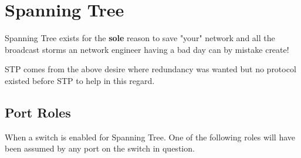 
\section{Spanning Tree}

Spanning Tree exists for the \textbf{sole} reason to save "your" network and all the broadcast storms an network engineer having a bad day can by mistake create!

STP comes from the above desire where redundancy was wanted but no protocol existed before STP to help in this regard.

\begin{table}[h]
    \centering
    \caption{Spanning Tree standrds}
    \label{stpstandards}
\end{table}

\subsection{Port Roles}

When a switch is enabled for Spanning Tree. One of the following roles will have been assumed by any port on the switch in question.

